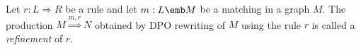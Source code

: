 \begin{example}
\end{example}

\begin{definition}
  Let $r:L{\Rightarrow} R$ be a rule and let $m:L\emb M$ be a matching in a graph $M$. The production $M\overset{m,r}{\Rightarrow} N$ obtained by DPO rewriting of $M$ using the rule $r$ is called a \emph{refinement} of $r$.
\end{definition}

